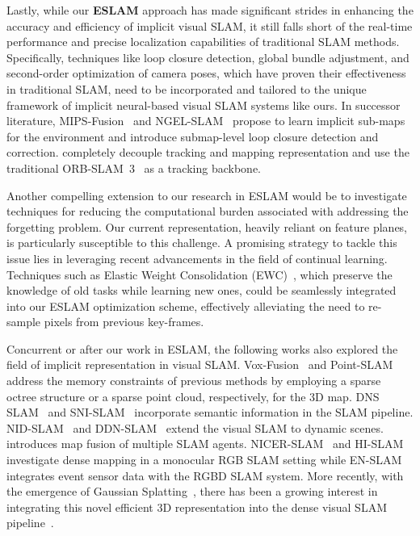 Lastly, while our \textbf{ESLAM} approach has made significant strides in enhancing the accuracy and efficiency of implicit visual SLAM, it still falls short of the real-time performance and precise localization capabilities of traditional SLAM methods. Specifically, techniques like loop closure detection, global bundle adjustment, and second-order optimization of camera poses, which have proven their effectiveness in traditional SLAM, need to be incorporated and tailored to the unique framework of implicit neural-based visual SLAM systems like ours. In successor literature, MIPS-Fusion~\citep{tang2023mips} and NGEL-SLAM~\citep{mao2023ngel} propose to learn implicit sub-maps for the environment and introduce submap-level loop closure detection and correction. \cite{haghighi2023neural} completely decouple tracking and mapping representation and use the traditional ORB-SLAM~3~\citep{campos2021orb} as a tracking backbone.

Another compelling extension to our research in ESLAM would be to investigate techniques for reducing the computational burden associated with addressing the forgetting problem. Our current representation, heavily reliant on feature planes, is particularly susceptible to this challenge. A promising strategy to tackle this issue lies in leveraging recent advancements in the field of continual learning. Techniques such as  Elastic Weight Consolidation (EWC)~\citep{kirkpatrick2017overcoming}, which preserve the knowledge of old tasks while learning new ones, could be seamlessly integrated into our ESLAM optimization scheme, effectively alleviating the need to re-sample pixels from previous key-frames.

Concurrent or after our work in ESLAM, the following works also explored the field of implicit representation in visual SLAM. Vox-Fusion~\citep{yang2022vox} and Point-SLAM~\citep{sandstrom2023point} address the memory constraints of previous methods by employing a sparse octree structure or a sparse point cloud, respectively, for the 3D map. DNS SLAM~\citep{li2023dns} and SNI-SLAM~\citep{zhu2023sni} incorporate semantic information in the SLAM pipeline. NID-SLAM~\cite{xu2024nid} and DDN-SLAM~\citep{li2024ddn} extend the visual SLAM to dynamic scenes. \cite{liu2023efficient} introduces map fusion of multiple SLAM agents. NICER-SLAM~\citep{zhu2023nicer} and HI-SLAM~\citep{zhang2023hi} investigate dense mapping in a monocular RGB SLAM setting while EN-SLAM~\citep{qu2023implicit} integrates event sensor data with the RGBD SLAM system. More recently, with the emergence of Gaussian Splatting~\citep{kerbl20233d}, there has been a growing interest in integrating this novel efficient 3D representation into the dense visual SLAM pipeline~\citep{matsuki2023gaussian,yan2023gs,yugay2023gaussian,keetha2023splatam,huang2023photo}.

